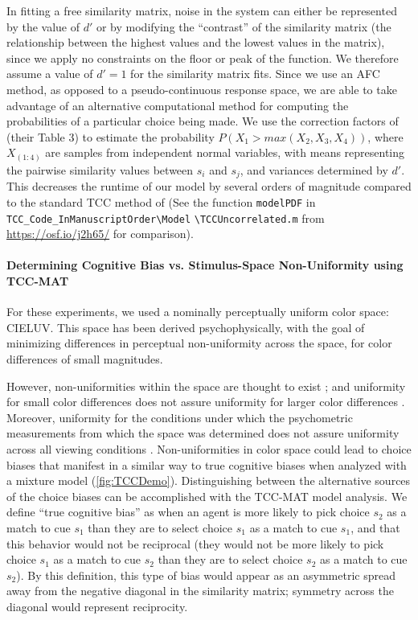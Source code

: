 In fitting a free similarity matrix, noise in the system can either be represented by the value of $d'$ or by modifying the “contrast” of the similarity matrix (the relationship between the highest values and the lowest values in the matrix), since we apply no constraints on the floor or peak of the function. We therefore assume a value of $d'=1$ for the similarity matrix fits.
Since we use an AFC method, as opposed to a pseudo-continuous response space, we are able to take advantage of an alternative computational method for computing the probabilities of a particular choice being made. 
We use the correction factors of \cite{mcgraw_common_1992} (their Table 3) to estimate the probability $P(X_1>max(X_2,X_3,X_4 ))$, where $X_(1:4)$ are samples from independent normal variables, with means representing the pairwise similarity values between $s_i$ and $s_j$, and variances determined by $d'$. 
This decreases the runtime of our model by several orders of magnitude compared to the standard TCC method of \cite{schurgin_psychophysical_2020} (See the function \verb|modelPDF| in \verb|TCC_Code_InManuscriptOrder|\verb|\Model| \verb|\TCCUncorrelated.m| from \url{https://osf.io/j2h65/} for comparison).

\paragraph{Determining Cognitive Bias vs. Stimulus-Space Non-Uniformity using TCC-MAT}

For these experiments, we used a nominally perceptually uniform color space: CIELUV. 
This space has been derived psychophysically, with the goal of minimizing differences in perceptual non-uniformity across the space, for color differences of small magnitudes.

However, non-uniformities within the space are thought to exist \citep{stockman_colorimetry_2010}; and uniformity for small color differences does not assure uniformity for larger color differences \citep{judd_ideal_1968}. 
Moreover, uniformity for the conditions under which the psychometric measurements from which the space was determined does not assure uniformity across all viewing conditions \citep{siuda-krzywicka_biological_2019}. 
Non-uniformities in color space could lead to choice biases that manifest in a similar way to true cognitive biases when analyzed with a mixture model (\autoref{fig:TCCDemo}). 
Distinguishing between the alternative sources of the choice biases can be accomplished with the TCC-MAT model analysis. 
We define “true cognitive bias” as when an agent is more likely to pick choice $s_2$ as a match to cue $s_1$ than they are to select choice $s_1$ as a match to cue $s_1$, and that this behavior would not be reciprocal (they would not be more likely to pick choice $s_1$ as a match to cue $s_2$ than they are to select choice $s_2$ as a match to cue $s_2$). 
By this definition, this type of bias would appear as an asymmetric spread away from the negative diagonal in the similarity matrix; symmetry across the diagonal would represent reciprocity. 

